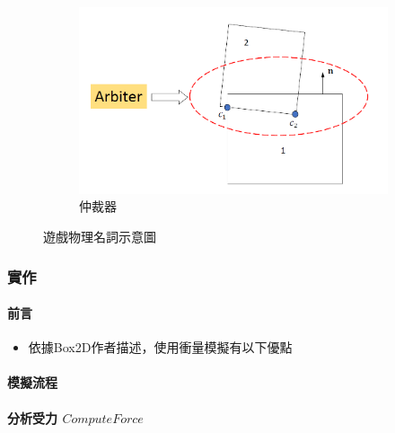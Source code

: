 \begin{figure}[h]
\begin{subfigure}[b]{0.19\linewidth}
    \includegraphics[width=\linewidth]{./resources/physics/Arbiter.png}
    \caption{仲裁器}
    \end{subfigure}
\caption{遊戲物理名詞示意圖}
\label{fig:game_physice_terms}
\end{figure}



\subsubsection{實作}

\paragraph{前言}

\begin{itemize}
    \item{依據Box2D作者描述，使用衝量模擬有以下優點}
\end{itemize}


\paragraph{模擬流程}
\paragraph{分析受力 \(Compute Force\)}

